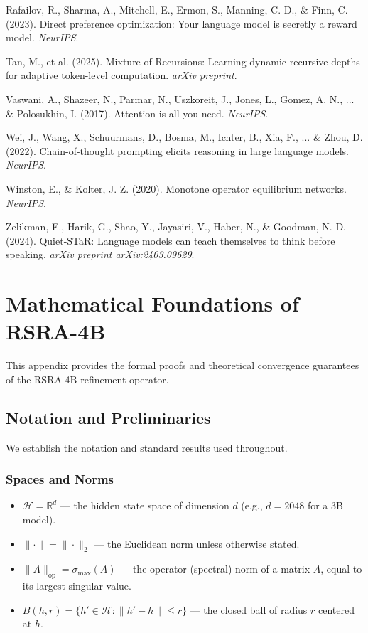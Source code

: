 \documentclass[11pt,a4paper]{article}
\theoremstyle{definition}
\begin{document}
\begin{description}
    \item Rafailov, R., Sharma, A., Mitchell, E., Ermon, S., Manning, C. D., \& Finn, C. (2023). Direct preference optimization: Your language model is secretly a reward model. \textit{NeurIPS}.
    \item Tan, M., et al. (2025). Mixture of Recursions: Learning dynamic recursive depths for adaptive token-level computation. \textit{arXiv preprint}.
    \item Vaswani, A., Shazeer, N., Parmar, N., Uszkoreit, J., Jones, L., Gomez, A. N., ... \& Polosukhin, I. (2017). Attention is all you need. \textit{NeurIPS}.
    \item Wei, J., Wang, X., Schuurmans, D., Bosma, M., Ichter, B., Xia, F., ... \& Zhou, D. (2022). Chain-of-thought prompting elicits reasoning in large language models. \textit{NeurIPS}.
    \item Winston, E., \& Kolter, J. Z. (2020). Monotone operator equilibrium networks. \textit{NeurIPS}.
    \item Zelikman, E., Harik, G., Shao, Y., Jayasiri, V., Haber, N., \& Goodman, N. D. (2024). Quiet-STaR: Language models can teach themselves to think before speaking. \textit{arXiv preprint arXiv:2403.09629}.
\end{description}

\newpage
\appendix
\section{Mathematical Foundations of RSRA-4B} \label{appendix:proofs}

This appendix provides the formal proofs and theoretical convergence guarantees of the RSRA-4B refinement operator.

\subsection{Notation and Preliminaries}

We establish the notation and standard results used throughout.

\subsubsection{Spaces and Norms}
\begin{itemize}
    \item $\mathcal{H} = \mathbb{R}^d$ --- the hidden state space of dimension $d$ (e.g., $d = 2048$ for a 3B model).
    \item $\|\cdot\| = \|\cdot\|_2$ --- the Euclidean norm unless otherwise stated.
    \item $\|A\|_{\mathrm{op}} = \sigma_{\max}(A)$ --- the operator (spectral) norm of a matrix $A$, equal to its largest singular value.
    \item $B(h, r) = \{h' \in \mathcal{H} : \|h' - h\| \leq r\}$ --- the closed ball of radius $r$ centered at $h$.
\end{itemize}
\end{document}
